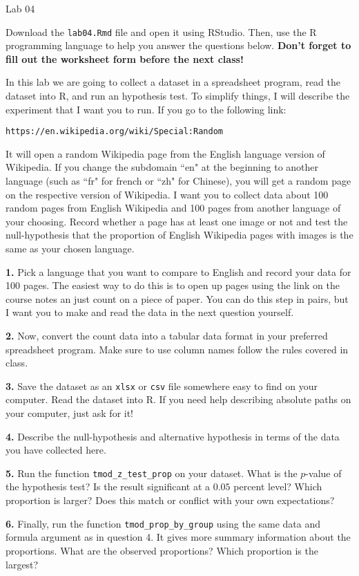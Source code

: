 \documentclass{tufte-handout}
\begin{document}
\justify

{\LARGE Lab 04}

\vspace*{18pt}

Download the \texttt{lab04.Rmd} file and open it using RStudio. Then, use the
R programming language to help you answer the questions below. \textbf{Don't
forget to fill out the worksheet form before the next class!}

In this lab we are going to collect a dataset in a spreadsheet
program, read the dataset into R, and run an hypothesis test. To simplify
things, I will describe the experiment that I want you to run. If you go
to the following link:
\begin{center}
\texttt{https://en.wikipedia.org/wiki/Special:Random}
\end{center}
It will open a random Wikipedia page from the English language version of
Wikipedia. If you change the subdomain ``en" at the beginning to another
language (such as ``fr" for french or ``zh" for Chinese), you will get a random
page on the respective version of Wikipedia. I want you to collect data about
100 random pages from English Wikipedia and 100 pages from another language of
your choosing. Record whether a page has at least one image or not and test
the null-hypothesis that the proportion of English Wikipedia pages with images
is the same as your chosen language.

\vspace*{12pt}

\textbf{1.} Pick a language that you want to compare to English and record
your data for 100 pages. The easiest way to do this is to open up pages using
the link on the course notes an just count on a piece of paper. You can do
this step in pairs, but I want you to make and read the data in the next
question yourself.

\textbf{2.} Now, convert the count data into a tabular data format in your
preferred spreadsheet program. Make sure to use column names follow the rules
covered in class.

\textbf{3.} Save the dataset as an \texttt{xlsx} or \texttt{csv} file
somewhere easy to find on your computer. Read the dataset into R. If you need
help  describing absolute paths on your computer, just ask for it!

\textbf{4.} Describe the null-hypothesis and alternative hypothesis in terms
of the data you have collected here.

\textbf{5.} Run the function \texttt{tmod\_z\_test\_prop} on your dataset.
What is the $p$-value of the hypothesis test? Is the result significant at a
$0.05$ percent level? Which proportion is larger? Does this match or conflict
with your own expectations?

\textbf{6.} Finally, run the function \texttt{tmod\_prop\_by\_group} using
the same data and formula argument as in question 4. It gives more summary
information about the proportions. What are the observed proportions? Which
proportion is the largest?
\end{document}
